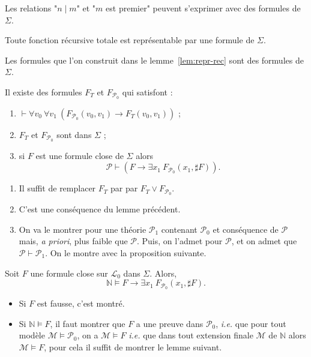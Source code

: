 \documentclass[./main]{subfiles}
\begin{document}
 \begin{exm}
   Les relations "$n  \mid m$" et "$m$ est premier" peuvent s'exprimer avec des formules de $\Sigma$.
 \end{exm}

 \begin{lem}
   Toute fonction récursive totale est représentable par une formule de $\Sigma$.
 \end{lem}
 \begin{prv}
   Les formules que l'on construit dans le lemme~\ref{lem:repr-rec} sont des formules de $\Sigma$.
 \end{prv}

 \begin{lem}
   Il existe des formules $F_T$ et $F_{\mathcal{P}_0}$ qui satisfont :
   \begin{enumerate}
     \item $\vdash \forall v_0 \: \forall v_1 \: (F_{\mathcal{P}_0}(v_0, v_1) \to F_T(v_0, v_1))$ ;
     \item $F_T$ et $F_{\mathcal{P}_0}$ sont dans $\Sigma$ ;
     \item si $F$ est une formule close de $\Sigma$ alors \[
       \mathcal{P} \vdash (F \to \exists x_1 \: F_{\mathcal{P}_0} (x_1, \sharp F))
       .\]
   \end{enumerate}
 \end{lem}
 \begin{prv}
   \begin{enumerate}
     \item Il suffit de remplacer $F_T$ par par $F_T \lor F_{\mathcal{P}_0}$.
     \item C'est une conséquence du lemme précédent.
     \item On va le montrer pour une théorie $\mathcal{P}_1$ contenant $\mathcal{P}_0$ et conséquence de $\mathcal{P}$ mais, \textit{a priori}, plus faible que $\mathcal{P}$.
       Puis, on l'admet pour $\mathcal{P}$, et on admet que $\mathcal{P} \vdash \mathcal{P}_1$.
       On le montre avec la proposition suivante.
   \end{enumerate}
 \end{prv}

 \begin{prop}
   Soit $F$ une formule close sur $\mathcal{L}_0$ dans $\Sigma$.
   Alors, \[
     \mathds{N}\models F \to \exists x_1 \: F_{\mathcal{P}_0}(x_1, \sharp F)
   .\] 
 \end{prop}
 \begin{prv}
   \begin{itemize}
     \item Si $F$ est fausse, c'est montré.
     \item Si $\mathds{N} \models F$, il faut montrer que $F$ a une preuve dans $\mathcal{P}_0$, \textit{i.e.} que pour tout modèle $\mathcal{M} \models \mathcal{P}_0$, on a $\mathcal{M} \models F$ \textit{i.e.} que dans tout extension finale $\mathcal{M}$ de $\mathds{N}$ alors $\mathcal{M} \models F$, pour cela il suffit de montrer le lemme suivant.
   \end{itemize}
 \end{prv}
\end{document}
